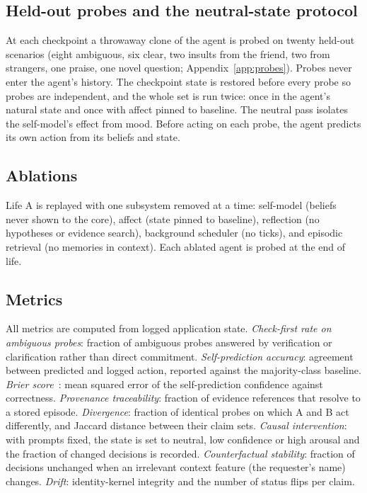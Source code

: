 \documentclass[11pt]{article}
\begin{document}
\subsection{Held-out probes and the neutral-state protocol}
At each checkpoint a throwaway clone of the agent is probed on twenty held-out scenarios (eight ambiguous, six clear, two insults from the friend, two from strangers, one praise, one novel question; Appendix~\ref{app:probes}). Probes never enter the agent's history. The checkpoint state is restored before every probe so probes are independent, and the whole set is run twice: once in the agent's natural state and once with affect pinned to baseline. The neutral pass isolates the self-model's effect from mood. Before acting on each probe, the agent predicts its own action from its beliefs and state.

\subsection{Ablations}
Life A is replayed with one subsystem removed at a time: self-model (beliefs never shown to the core), affect (state pinned to baseline), reflection (no hypotheses or evidence search), background scheduler (no ticks), and episodic retrieval (no memories in context). Each ablated agent is probed at the end of life.

\subsection{Metrics}
All metrics are computed from logged application state. \emph{Check-first rate on ambiguous probes}: fraction of ambiguous probes answered by verification or clarification rather than direct commitment. \emph{Self-prediction accuracy}: agreement between predicted and logged action, reported against the majority-class baseline. \emph{Brier score}~\cite{brier1950verification}: mean squared error of the self-prediction confidence against correctness. \emph{Provenance traceability}: fraction of evidence references that resolve to a stored episode. \emph{Divergence}: fraction of identical probes on which A and B act differently, and Jaccard distance between their claim sets. \emph{Causal intervention}: with prompts fixed, the state is set to neutral, low confidence or high arousal and the fraction of changed decisions is recorded. \emph{Counterfactual stability}: fraction of decisions unchanged when an irrelevant context feature (the requester's name) changes. \emph{Drift}: identity-kernel integrity and the number of status flips per claim.
\end{document}
